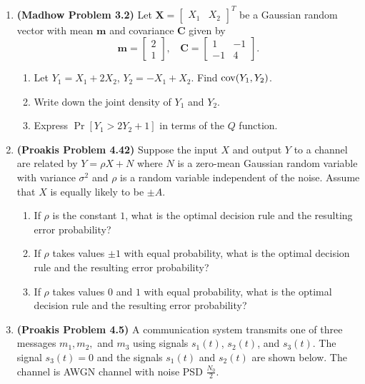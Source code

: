 \documentclass[10pt]{report}
\newcommand{\cov}{\operatornamewithlimits{cov}}
\begin{document}
\begin{enumerate}
  \item \textbf{(Madhow Problem 3.2)} Let $\mathbf{X} = \begin{bmatrix} X_1 & X_2\end{bmatrix}^T$ be a Gaussian random vector with mean $\mathbf{m}$ and covariance $\mathbf{C}$ given by
    \begin{equation*}
      \mathbf{m} = \begin{bmatrix} 2 \\ 1\end{bmatrix}, \ \ \ \ \mathbf{C} = \begin{bmatrix} 1 & -1 \\ -1 & 4 \end{bmatrix}.
    \end{equation*}
    \begin{enumerate}
      \item Let $Y_1 = X_1+2X_2$, $Y_2 = -X_1+X_2$. Find $\cov(Y_1,Y_2)$.
      \item Write down the joint density of $Y_1$ and $Y_2$.
      \item Express $\Pr[Y_1 > 2Y_2 + 1]$ in terms of the $Q$ function.
    \end{enumerate}
  \item \textbf{(Proakis Problem 4.42)} Suppose the input $X$ and output $Y$ to a channel are related by $Y = \rho X + N$ where $N$ is a zero-mean Gaussian random variable with variance $\sigma^2$ and $\rho$ is a random variable independent of the noise. Assume that $X$ is equally likely to be $\pm A$.
    \begin{enumerate}
      \item If $\rho$ is the constant $1$, what is the optimal decision rule and the resulting error probability?
      \item If $\rho$ takes values $\pm 1$ with equal probability, what is the optimal decision rule and the resulting error probability?
      \item If $\rho$ takes values $0$ and $1$ with equal probability, what is the optimal decision rule and the resulting error probability?
    \end{enumerate}
  \item \textbf{(Proakis Problem 4.5)} A communication system transmits one of three messages $m_1, m_2,$ and $m_3$ using signals $s_1(t)$, $s_2(t)$, and $s_3(t)$. The signal $s_3(t) = 0$ and the signals $s_1(t)$ and $s_2(t)$ are shown below. The channel is AWGN channel with noise PSD $\frac{N_0}{2}$.

\end{enumerate}
\end{document}
